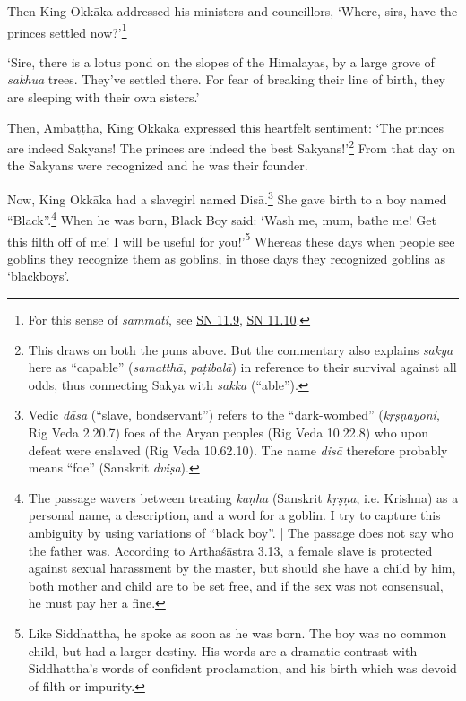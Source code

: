\documentclass[12pt,openany]{book}%
\begin{document}
Then King \textsanskrit{Okkāka} addressed his ministers and councillors, ‘Where, sirs, have the princes settled now?’\footnote{For this sense of \textit{sammati}, see \href{https://suttacentral.net/sn11.9/en/sujato}{SN 11.9}, \href{https://suttacentral.net/sn11.10/en/sujato}{SN 11.10}. } 

‘Sire, there is a lotus pond on the slopes of the Himalayas, by a large grove of \textit{sakhua} trees. They’ve settled there. For fear of breaking their line of birth, they are sleeping with their own sisters.’ 

Then, \textsanskrit{Ambaṭṭha}, King \textsanskrit{Okkāka} expressed this heartfelt sentiment: ‘The princes are indeed Sakyans! The princes are indeed the best Sakyans!’\footnote{This draws on both the puns above. But the commentary also explains \textit{sakya} here as “capable” (\textit{\textsanskrit{samatthā}}, \textit{\textsanskrit{paṭibalā}}) in reference to their survival against all odds, thus connecting Sakya with \textit{sakka} (“able”). } From that day on the Sakyans were recognized and he was their founder. 

Now, King \textsanskrit{Okkāka} had a slavegirl named \textsanskrit{Disā}.\footnote{Vedic \textit{\textsanskrit{dāsa}} (“slave, bondservant”) refers to the “dark-wombed” (\textit{\textsanskrit{kṛṣṇayoni}}, Rig Veda 2.20.7) foes of the Aryan peoples (Rig Veda 10.22.8) who upon defeat were enslaved (Rig Veda 10.62.10). The name \textit{\textsanskrit{disā}} therefore probably means “foe” (Sanskrit \textit{\textsanskrit{dviṣa}}). } She gave birth to a boy named “Black”.\footnote{The passage wavers between treating \textit{\textsanskrit{kaṇha}} (Sanskrit \textit{\textsanskrit{kṛṣṇa}}, i.e. Krishna) as a personal name, a description, and a word for a goblin. I try to capture this ambiguity by using variations of “black boy”. | The passage does not say who the father was. According to \textsanskrit{Arthaśāstra} 3.13, a female slave is protected against sexual harassment by the master, but should she have a child by him, both mother and child are to be set free, and if the sex was not consensual, he must pay her a fine. } When he was born, Black Boy said: ‘Wash me, mum, bathe me! Get this filth off of me! I will be useful for you!’\footnote{Like Siddhattha, he spoke as soon as he was born. The boy was no common child, but had a larger destiny. His words are a dramatic contrast with Siddhattha’s words of confident proclamation, and his birth which was devoid of filth or impurity. } Whereas these days when people see goblins they recognize them as goblins, in those days they recognized goblins as ‘blackboys’. 
\end{document}
